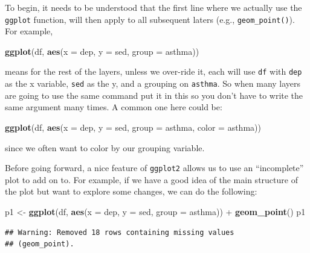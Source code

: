 \documentclass[]{tufte-book}
\newenvironment{Shaded}{}{}
\newcommand{\KeywordTok}[1]{\textcolor[rgb]{0.00,0.44,0.13}{\textbf{#1}}}
\newcommand{\DataTypeTok}[1]{\textcolor[rgb]{0.56,0.13,0.00}{#1}}
\newcommand{\StringTok}[1]{\textcolor[rgb]{0.25,0.44,0.63}{#1}}
\newcommand{\OperatorTok}[1]{\textcolor[rgb]{0.40,0.40,0.40}{#1}}
\newcommand{\NormalTok}[1]{#1}
\theoremstyle{definition}
\theoremstyle{definition}
\theoremstyle{remark}
\begin{document}
To begin, it needs to be understood that the first line where we
actually use the \texttt{ggplot} function, will then apply to all
subsequent laters (e.g., \texttt{geom\_point()}). For example,

\begin{Shaded}
\begin{Highlighting}[]
\KeywordTok{ggplot}\NormalTok{(df, }\KeywordTok{aes}\NormalTok{(}\DataTypeTok{x =}\NormalTok{ dep, }\DataTypeTok{y =}\NormalTok{ sed, }\DataTypeTok{group =}\NormalTok{ asthma))}
\end{Highlighting}
\end{Shaded}

means for the rest of the layers, unless we over-ride it, each will use
\texttt{df} with \texttt{dep} as the x variable, \texttt{sed} as the y,
and a grouping on \texttt{asthma}. So when many layers are going to use
the same command put it in this so you don't have to write the same
argument many times. A common one here could be:

\begin{Shaded}
\begin{Highlighting}[]
\KeywordTok{ggplot}\NormalTok{(df, }\KeywordTok{aes}\NormalTok{(}\DataTypeTok{x =}\NormalTok{ dep, }\DataTypeTok{y =}\NormalTok{ sed, }\DataTypeTok{group =}\NormalTok{ asthma, }
    \DataTypeTok{color =}\NormalTok{ asthma))}
\end{Highlighting}
\end{Shaded}

since we often want to color by our grouping variable.

Before going forward, a nice feature of \texttt{ggplot2} allows us to
use an ``incomplete'' plot to add on to. For example, if we have a good
idea of the main structure of the plot but want to explore some changes,
we can do the following:

\begin{Shaded}
\begin{Highlighting}[]
\NormalTok{p1 <-}\StringTok{ }\KeywordTok{ggplot}\NormalTok{(df, }\KeywordTok{aes}\NormalTok{(}\DataTypeTok{x =}\NormalTok{ dep, }\DataTypeTok{y =}\NormalTok{ sed, }\DataTypeTok{group =}\NormalTok{ asthma)) }\OperatorTok{+}\StringTok{ }
\StringTok{    }\KeywordTok{geom_point}\NormalTok{()}
\NormalTok{p1}
\end{Highlighting}
\end{Shaded}

\begin{verbatim}
## Warning: Removed 18 rows containing missing values
## (geom_point).
\end{verbatim}
\end{document}
